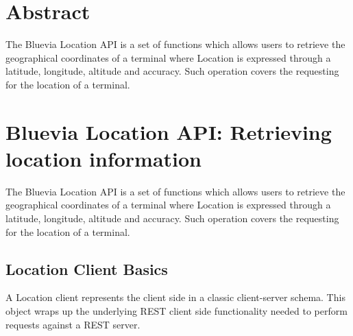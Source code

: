 \hypertarget{blv_location_guide_location_abstract_sec}{}\section{Abstract}\label{blv_location_guide_location_abstract_sec}
The Bluevia Location API is a set of functions which allows users to retrieve the geographical coordinates of a terminal where Location is expressed through a latitude, longitude, altitude and accuracy. Such operation covers the requesting for the location of a terminal.\hypertarget{blv_location_guide_blv_location_api_retrieving_location_information_sec}{}\section{Bluevia Location API: Retrieving location information}\label{blv_location_guide_blv_location_api_retrieving_location_information_sec}
The Bluevia Location API is a set of functions which allows users to retrieve the geographical coordinates of a terminal where Location is expressed through a latitude, longitude, altitude and accuracy. Such operation covers the requesting for the location of a terminal.\hypertarget{blv_location_guide_location_client_basics_sec}{}\subsection{Location Client Basics}\label{blv_location_guide_location_client_basics_sec}
A Location client represents the client side in a classic client-\/server schema. This object wraps up the underlying REST client side functionality needed to perform requests against a REST server.

